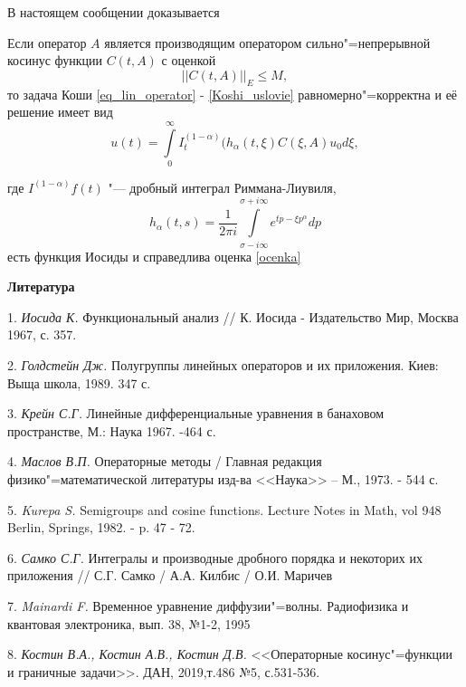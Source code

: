 В настоящем сообщении доказывается
	\begin{theorem}
		Если оператор $A$ является производящим оператором сильно"=непрерывной косинус функции $C(t,A)$ с оценкой
		\begin{equation}
			||C(t,A)||_E \leq M,
		\end{equation}
		то задача Коши \ref{eq_lin_operator} - \ref{Koshi_uslovie} равномерно"=корректна и её решение имеет вид
		\begin{equation}
			u(t) = \int\limits^{\infty}_0 I^{(1-\alpha)}_t (h_{\alpha}(t, \xi) C(\xi, A)u_0 d\xi,
		\end{equation}
	\end{theorem}
	где $I^{(1-\alpha)}f(t)$ "--- дробный интеграл Риммана-Лиувиля,
	$$
		h_\alpha(t,s) = \frac{1}{2\pi i} \int\limits^{\sigma + i\infty}_{\sigma - i \infty} e^{tp-\xi p^{\alpha}} dp
	$$ есть функция Иосиды
	и справедлива оценка \ref{ocenka}

\smallskip \centerline {\bf Литература} \nopagebreak

1. {\it Иосида К.} Функциональный анализ // К. Иосида - Издательство Мир, Москва 1967, с. 357.

2. {\it Голдстейн Дж.} Полугруппы линейных операторов и их приложения. Киев: Выща школа, 1989. 347 с.

3. {\it Крейн С.Г.} Линейные дифференциальные уравнения в банаховом пространстве, М.: Наука 1967. -464 с.

4. {\it Маслов В.П.} Операторные методы / Главная редакция физико"=математической литературы изд-ва <<Наука>> -- М., 1973. - 544 с.

5. {\it Kurepa S.} Semigroups and cosine functions. Lecture Notes in Math, vol 948 Berlin, Springs, 1982. - p. 47 - 72.

6. {\it Самко С.Г.} Интегралы и производные дробного порядка и некоторих их приложения // С.Г. Самко / А.А. Килбис / О.И. Маричев

7. {\it Mainardi F.} Временное уравнение диффузии"=волны. Радиофизика и квантовая электроника, вып. 38, №1-2, 1995

8. {\it Костин В.А., Костин А.В., Костин Д.В.} <<Операторные косинус"=функции и граничные задачи>>. ДАН, 2019,т.486 №5, с.531-536.

